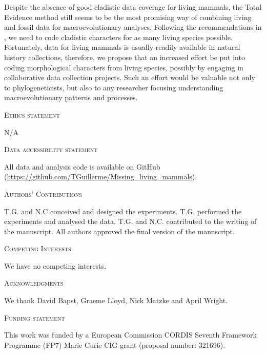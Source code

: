 \documentclass[12pt,letterpaper]{article}
\renewcommand{\section}[1]{%
\bigskip
\begin{center}
\begin{Large}
\normalfont\scshape #1
\medskip
\end{Large}
\end{center}}
\begin{document}
Despite the absence of good cladistic data coverage for living mammals, the Total Evidence method still seems to be the most promising way of combining living and fossil data for macroevolutionary analyses. 
Following the recommendations in \cite{GuillermeCooper}, we need to code cladistic characters for as many living species possible. 
Fortunately, data for living mammals is usually readily available in natural history collections, therefore, we propose that an increased effort be put into coding morphological characters from living species, possibly by engaging in collaborative data collection projects.
Such an effort would be valuable not only to phylogeneticists, but also to any researcher focusing understanding macroevolutionary patterns and processes.

\section{Ethics statement}
N/A
\section{Data accessibility statement}
All data and analysis code is available on GitHub (\url{https://github.com/TGuillerme/Missing_living_mammals}).
\section{Authors' Contributions}
T.G. and N.C conceived and designed the experiments. T.G. performed the experiments and analysed the data. T.G. and N.C. contributed to the writing of the manuscript. All authors approved the final version of the manuscript.
\section{Competing Interests}
We have no competing interests.
\section{Acknowledgments}
We thank David Bapst, Graeme Lloyd, Nick Matzke and April Wright.
\section{Funding statement}
This work was funded by a European Commission CORDIS Seventh Framework Programme (FP7) Marie Curie CIG grant (proposal number: 321696).




\end{document}
